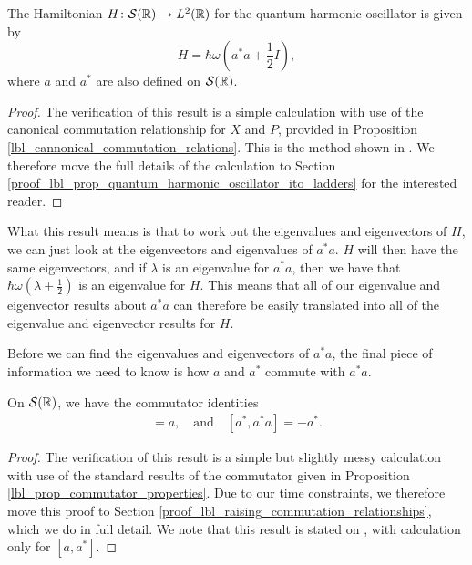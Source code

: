 \begin{proposition}\label{lbl_prop_quantum_harmonic_oscillator_ito_ladders}
  The Hamiltonian $H \colon \mathcal{S}(\mathbb{R}) \to L^2(\mathbb{R})$ for the quantum harmonic oscillator is given by
  \begin{equation*}
    H = \hbar \omega \left(a^* a + \frac{1}{2}I \right),
  \end{equation*}
  where $a$ and $a^*$ are also defined on $\mathcal{S}(\mathbb{R})$.
\end{proposition}
\begin{proof}
  The verification of this result is a simple calculation with use of the canonical commutation relationship for $X$ and $P$, provided in Proposition \eqref{lbl_cannonical_commutation_relations}. This is the method shown in {\cite[p.229]{Hall2013}}. We therefore move the full details of the calculation to Section \eqref{proof_lbl_prop_quantum_harmonic_oscillator_ito_ladders} for the interested reader.
\end{proof}

What this result means is that to work out the eigenvalues and eigenvectors of $H$, we can just look at the eigenvectors and eigenvalues of $a^*a$. $H$ will then have the same eigenvectors, and if $\lambda$ is an eigenvalue for $a^* a$, then we have that $\hbar \omega \left(\lambda + \frac{1}{2}\right)$ is an eigenvalue for $H$. This means that all of our eigenvalue and eigenvector results about $a^*a$ can therefore be easily translated into all of the eigenvalue and eigenvector results for $H$.

\medskip

Before we can find the eigenvalues and eigenvectors of $a^*a$, the final piece of information we need to know is how $a$ and $a^*$ commute with $a^*a$.

\begin{proposition} \label{lbl_raising_commutation_relationships}
  On $\mathcal{S}(\mathbb{R})$, we have the commutator identities
  \begin{align*}
    [a, a^* a] = a,
    \quad \text{and} \quad
    [a^*, a^* a] = -a^*.
  \end{align*}
\end{proposition}
\begin{proof}
  The verification of this result is a simple but slightly messy calculation with use of the standard results of the commutator given in Proposition \eqref{lbl_prop_commutator_properties}. Due to our time constraints, we therefore move this proof to Section \eqref{proof_lbl_raising_commutation_relationships}, which we do in full detail. We note that this result is stated on {{\cite[p.229]{Hall2013}}}, with calculation only for $[a,a^*]$.
\end{proof}

